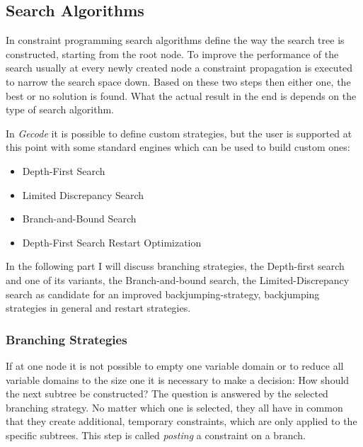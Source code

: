 \documentclass[10pt,
               a4paper,
               journal,
               ]{IEEEtran}
\begin{document}
	\subsection{Search Algorithms}
	In constraint programming search algorithms define the way the search tree is constructed, starting from the root node. To improve the performance of the search usually at every newly created node a constraint propagation is executed to narrow the search space down. Based on these two steps then either one, the best or no solution is found. What the actual result in the end is depends on the type of search algorithm.
	
	In \emph{Gecode} it is possible to define custom strategies, but the user is supported at this point with some standard engines which can be used to build custom ones:
	\begin{itemize}
	\item Depth-First Search
	\item Limited Discrepancy Search
	\item Branch-and-Bound Search
	\item Depth-First Search Restart Optimization
	\end{itemize}
	
	In the following part I will discuss branching strategies, the Depth-first search and one of its variants, the Branch-and-bound search, the Limited-Discrepancy search as candidate for an improved backjumping-strategy, backjumping strategies in general and restart strategies.
	
	\subsubsection{Branching Strategies}
	If at one node it is not possible to empty one variable domain or to reduce all variable domains to the size one it is necessary to make a decision: How should the next subtree be constructed? The question is answered by the selected branching strategy. No matter which one is selected, they all have in common that they create additional, temporary constraints, which are only applied to the specific subtrees. This step is called \emph{posting} a constraint on a branch.
	
\end{document}
